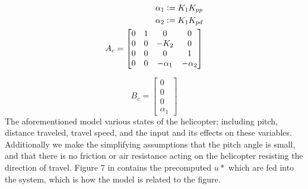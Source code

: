 \begin{subequations}
\begin{align}
\alpha_1 \vcentcolon= K_1K_{pp} \\
\alpha_2 \vcentcolon= K_1K_{pd} \\
A_c =
\begin{bmatrix}
    0 & 1 & 0 & 0 \\
    0 & 0 & -K_2 & 0 \\
    0 & 0 & 0 & 1 \\
    0 & 0 & -\alpha_1 & - \alpha_2
\end{bmatrix}
\label{eq:initial_state}
\end{align}
\end{subequations}

\begin{equation}
B_c =
\begin{bmatrix}
	0 \\
	0 \\
	0 \\
	\alpha_1
\end{bmatrix}
\end{equation}
The aforementioned model various states of the helicopter; including pitch, distance traveled, travel speed, and the input and its effects on these variables. Additionally we make the  simplifying assumptions that the pitch angle is small, and that there is no friction or air resistance acting on the helicopter resisting the direction of travel. Figure 7 in  contains the precomputed $u*$ which are fed into the system, which is how the model is related to the figure.


